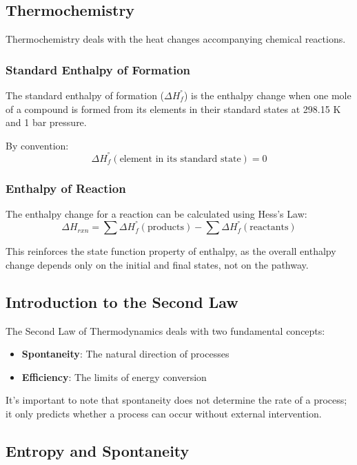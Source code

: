 \documentclass{article}
\theoremstyle{definition}
\begin{document}
\subsection{Thermochemistry}

Thermochemistry deals with the heat changes accompanying chemical reactions.

\subsubsection{Standard Enthalpy of Formation}

The standard enthalpy of formation ($\Delta H_f^°$) is the enthalpy change when one mole of a compound is formed from its elements in their standard states at 298.15 K and 1 bar pressure.

By convention:
\[
\Delta H_f^°(\text{element in its standard state}) = 0
\]

\subsubsection{Enthalpy of Reaction}

The enthalpy change for a reaction can be calculated using Hess's Law:
\[
\Delta H_{rxn} = \sum \Delta H_f^°(\text{products}) - \sum \Delta H_f^°(\text{reactants})
\]

This reinforces the state function property of enthalpy, as the overall enthalpy change depends only on the initial and final states, not on the pathway.

\subsection{Introduction to the Second Law}

The Second Law of Thermodynamics deals with two fundamental concepts:
\begin{itemize}
    \item \textbf{Spontaneity}: The natural direction of processes
    \item \textbf{Efficiency}: The limits of energy conversion
\end{itemize}

It's important to note that spontaneity does not determine the rate of a process; it only predicts whether a process can occur without external intervention.

\subsection{Entropy and Spontaneity}
\end{document}

